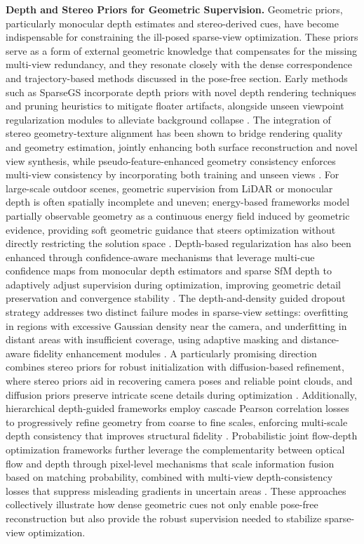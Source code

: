\documentclass[11pt]{article}
\begin{document}
\textbf{Depth and Stereo Priors for Geometric Supervision.} Geometric priors, particularly monocular depth estimates and stereo-derived cues, have become indispensable for constraining the ill-posed sparse-view optimization. These priors serve as a form of external geometric knowledge that compensates for the missing multi-view redundancy, and they resonate closely with the dense correspondence and trajectory-based methods discussed in the pose-free section. Early methods such as SparseGS incorporate depth priors with novel depth rendering techniques and pruning heuristics to mitigate floater artifacts, alongside unseen viewpoint regularization modules to alleviate background collapse \cite{ref258}. The integration of stereo geometry-texture alignment has been shown to bridge rendering quality and geometry estimation, jointly enhancing both surface reconstruction and novel view synthesis, while pseudo-feature-enhanced geometry consistency enforces multi-view consistency by incorporating both training and unseen views \cite{ref262}. For large-scale outdoor scenes, geometric supervision from LiDAR or monocular depth is often spatially incomplete and uneven; energy-based frameworks model partially observable geometry as a continuous energy field induced by geometric evidence, providing soft geometric guidance that steers optimization without directly restricting the solution space \cite{ref194}. Depth-based regularization has also been enhanced through confidence-aware mechanisms that leverage multi-cue confidence maps from monocular depth estimators and sparse SfM depth to adaptively adjust supervision during optimization, improving geometric detail preservation and convergence stability \cite{ref263}. The depth-and-density guided dropout strategy addresses two distinct failure modes in sparse-view settings: overfitting in regions with excessive Gaussian density near the camera, and underfitting in distant areas with insufficient coverage, using adaptive masking and distance-aware fidelity enhancement modules \cite{ref264}. A particularly promising direction combines stereo priors for robust initialization with diffusion-based refinement, where stereo priors aid in recovering camera poses and reliable point clouds, and diffusion priors preserve intricate scene details during optimization \cite{ref257}. Additionally, hierarchical depth-guided frameworks employ cascade Pearson correlation losses to progressively refine geometry from coarse to fine scales, enforcing multi-scale depth consistency that improves structural fidelity \cite{ref265}. Probabilistic joint flow-depth optimization frameworks further leverage the complementarity between optical flow and depth through pixel-level mechanisms that scale information fusion based on matching probability, combined with multi-view depth-consistency losses that suppress misleading gradients in uncertain areas \cite{ref266}. These approaches collectively illustrate how dense geometric cues not only enable pose-free reconstruction but also provide the robust supervision needed to stabilize sparse-view optimization.
\end{document}
